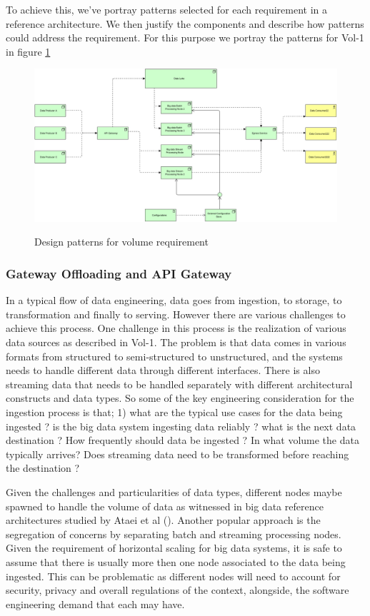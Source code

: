 \documentclass[conference]{IEEEtran}
\begin{document}
To achieve this, we've portray patterns selected for each requirement in a reference architecture. We then justify the components and describe how patterns could address the requirement. For this purpose we portray the patterns for Vol-1 in figure \ref{fig-vol-1}


\begin{figure}[h!]
    \centering 
    \includegraphics[width=17cm]{../Media/Vol-1 Requirement RA.jpg}
    \label{fig-vol-1}
    \caption{Design patterns for volume requirement}
\end{figure}

\subsubsection{Gateway Offloading and API Gateway}

In a typical flow of data engineering, data goes from ingestion, to storage, to transformation and finally to serving. However there are various challenges to achieve this process. One challenge in this process is the realization of various data sources as described in Vol-1. The problem is that data comes in various formats from structured to semi-structured to unstructured, and the systems needs to handle different data through different interfaces. There is also streaming data that needs to be handled separately with different architectural constructs and data types. So some of the key engineering consideration for the ingestion process is that; 1) what are the typical use cases for the data being ingested ? is the big data system ingesting data reliably ? what is the next data destination ? How frequently should data be ingested ? In what volume the data typically arrives? Does streaming data need to be transformed before reaching the destination ? 

Given the challenges and particularities of data types, different nodes maybe spawned to handle the volume of data as witnessed in big data reference architectures studied by Ataei et al (\cite{ataei2020big}). Another popular approach is the segregation of concerns by separating batch and streaming processing nodes. Given the requirement of horizontal scaling for big data systems, it is safe to assume that there is usually more then one node associated to the data being ingested. This can be problematic as different nodes will need to account for security, privacy and overall regulations of the context, alongside, the software engineering demand that each may have. 
\end{document}
